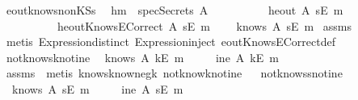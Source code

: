 \begin{isabellebody}
{\isafoldproof}\isadelimproof
\isanewline
\endisadelimproof
\isanewline
{}\isamarkupfalse \ eout{\isacharunderscore}knows{\isacharunderscore}nonKS{\isacharunderscore}s{\isacharcolon}\isanewline
\ \ h{}{\isacharcolon}{\isachardoublequoteopen}m\ {\isasymnotin}\ specSecrets\ A{\isachardoublequoteclose}\isanewline
\ \ \ \ \ \ \ \ \ \ h{}{\isacharcolon}{\isachardoublequoteopen}eout\ A\ {\isacharparenleft}sE\ m{\isacharparenright}{\isachardoublequoteclose}\isanewline
\ \ \ \ \ \ \ \ \ \ h{}{\isacharcolon}{\isachardoublequoteopen}eoutKnowsECorrect\ A\ {\isacharparenleft}sE\ m{\isacharparenright}{\isachardoublequoteclose}\isanewline
\ \ \ \ {\isachardoublequoteopen}knows\ A\ {\isacharbrackleft}sE\ m{\isacharbrackright}{\isachardoublequoteclose}\isanewline
\isadelimproof
\endisadelimproof
\isatagproof
{}\isamarkupfalse \ assms\isanewline
{}\isamarkupfalse \ {\isacharparenleft}metis\ Expression{\isachardot}distinct{\isacharparenleft}{}{\isacharparenright}\ Expression{\isachardot}inject{\isacharparenleft}{}{\isacharparenright}\ eoutKnowsECorrect{\isacharunderscore}def{\isacharparenright}\endisatagproof
{\isafoldproof}\isadelimproof
\isanewline
\endisadelimproof
\isanewline
{}\isamarkupfalse \ not{\isacharunderscore}knows{\isacharunderscore}k{\isacharunderscore}not{\isacharunderscore}ine{\isacharcolon}\isanewline
{}\ {\isachardoublequoteopen}{\isasymnot}\ knows\ A\ {\isacharbrackleft}kE\ m{\isacharbrackright}{\isachardoublequoteclose}\isanewline
{}\ \ \ \ {\isachardoublequoteopen}{\isasymnot}\ ine\ A\ {\isacharparenleft}kE\ m{\isacharparenright}{\isachardoublequoteclose}\isanewline
\isadelimproof
\endisadelimproof
\isatagproof
{}\isamarkupfalse \ assms\ \isamarkupfalse \ {\isacharparenleft}metis\ knows{}know{\isacharunderscore}neg{\isacharunderscore}k\ not{\isacharunderscore}know{\isacharunderscore}k{\isacharunderscore}not{\isacharunderscore}ine{\isacharparenright}\endisatagproof
{\isafoldproof}\isadelimproof
\ \isanewline
\endisadelimproof
\isanewline
{}\isamarkupfalse \ not{\isacharunderscore}knows{\isacharunderscore}s{\isacharunderscore}not{\isacharunderscore}ine{\isacharcolon}\isanewline
{}\ {\isachardoublequoteopen}{\isasymnot}\ knows\ A\ {\isacharbrackleft}sE\ m{\isacharbrackright}{\isachardoublequoteclose}\isanewline
{}\ \ \ \ {\isachardoublequoteopen}{\isasymnot}\ ine\ A\ {\isacharparenleft}sE\ m{\isacharparenright}{\isachardoublequoteclose}\isanewline

\end{isabellebody}
